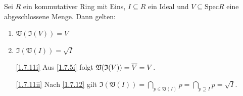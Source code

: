 \documentclass[a4paper,12pt]{scrbook}
\makeatletter
\theoremstyle{blah}
\theoremstyle{stz}
\renewcommand{\proofname}{Beweis}
\renewenvironment{proof}[1][\proofname]{\par
  \pushQED{\qed}%
  \normalfont \topsep6\p@\@plus6\p@\relax
  \trivlist
  \item[\hskip\labelsep
        \itshape
    #1\@addpunct{:}]\ignorespaces
}{%
  \popQED\endtrivlist\@endpefalse
}
\def\V{\mathfrak{V}}
\def\I{\mathfrak{I}}
\newcommand{\Spec}{\mathrm{Spec}}
\def\Bar#1{\ensuremath\overline{#1}}
\makeatother
\begin{document}
\begin{prop}\label{1.7.11}
  Sei $R$ ein kommutativer Ring mit Eins, $I\subseteq R$ ein Ideal und $V\subseteq\Spec R$ eine abgeschlossene Menge. Dann
  gelten:
  \begin{enumerate}
  \item\label{1.7.11i} $\V(\I(V))=V$
  \item\label{1.7.11ii} $\I(\V(I))=\sqrt{I}$
  \end{enumerate}
\end{prop}
\begin{proof}
  \begin{enumerate}
  \item[\ref{1.7.11i}] Aus \autoref{1.7.5i} folgt $\V(\I(V))=\Bar{V}=V$.
  \item[\ref{1.7.11ii}] Nach \autoref{1.7.12} gilt $\displaystyle\I(\V(I))=\bigcap_{p\in\V(I)}p=\bigcap_{p\supseteq I}p=\sqrt{I}$.
  \end{enumerate}
\end{proof}
\end{document}
